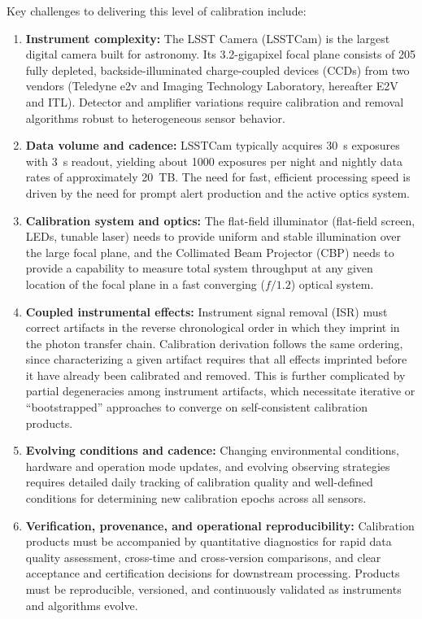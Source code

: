 Key challenges to delivering this level of calibration include:
\begin{enumerate}
    \item \textbf{Instrument complexity:} The LSST Camera (LSSTCam) is the largest digital camera built for astronomy.
    Its 3.2-gigapixel focal plane consists of 205 fully depleted, backside-illuminated charge-coupled devices (CCDs) from two vendors (Teledyne e2v and Imaging Technology Laboratory, hereafter E2V and ITL).
    Detector and amplifier variations require calibration and removal algorithms robust to heterogeneous sensor behavior.
    \item \textbf{Data volume and cadence:} LSSTCam typically acquires 30~s exposures with 3~s readout, yielding about 1000 exposures per night and nightly data rates of approximately 20~TB. The need for fast, efficient processing speed is driven by the need for prompt alert production and the active optics system.
    \item \textbf{Calibration system and optics:} The flat-field illuminator (flat-field screen, LEDs, tunable laser) needs to provide uniform and stable illumination over the large focal plane, and the Collimated Beam Projector (CBP) needs to provide a capability to measure total system throughput at any given location of the focal plane in a fast converging ($f/1.2$) optical system.
    \item \textbf{Coupled instrumental effects:} Instrument signal removal (ISR) must correct artifacts in the reverse chronological order in which they imprint in the photon transfer chain.
    Calibration derivation follows the same ordering, since characterizing a given artifact requires that all effects imprinted before it have already been calibrated and removed.
    This is further complicated by partial degeneracies among instrument artifacts, which necessitate iterative or ``bootstrapped'' approaches to converge on self-consistent calibration products.
    \item \textbf{Evolving conditions and cadence:} Changing environmental conditions, hardware and operation mode updates, and evolving observing strategies requires detailed daily tracking of calibration quality and well-defined conditions for determining new calibration epochs across all sensors.
    \item \textbf{Verification, provenance, and operational reproducibility:} Calibration products must be accompanied by quantitative diagnostics for rapid data quality assessment, cross-time and cross-version comparisons, and clear acceptance and certification decisions for downstream processing.
    Products must be reproducible, versioned, and continuously validated as instruments and algorithms evolve.
\end{enumerate}

